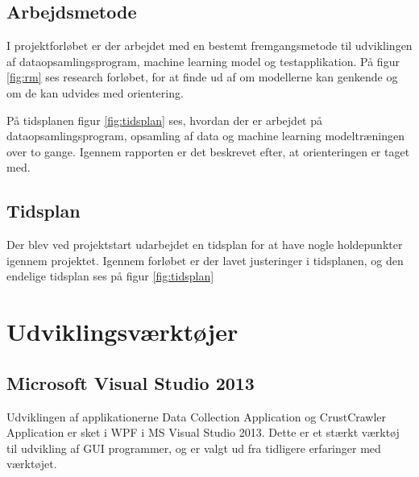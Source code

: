 \subsection{Arbejdsmetode}
I projektforløbet er der arbejdet med en bestemt fremgangsmetode til udviklingen af dataopsamlingsprogram, machine learning model og testapplikation. På figur \ref{fig:rm} ses research forløbet, for at finde ud af om modellerne kan genkende og om de kan udvides med orientering.


På tidsplanen figur \ref{fig:tidsplan} ses, hvordan der er arbejdet på dataopsamlingsprogram, opsamling af data og machine learning modeltræningen over to gange. Igennem rapporten er det beskrevet efter, at orienteringen er taget med.


\subsection{Tidsplan}
\label{sec:tidsplan}
Der blev ved projektstart udarbejdet en tidsplan for at have nogle holdepunkter igennem projektet. Igennem forløbet er der lavet justeringer i tidsplanen, og den endelige tidsplan ses på figur \ref{fig:tidsplan}


\section{Udviklingsværktøjer}
\label{sec:Udviklingsvaerktojer}

\subsection*{Microsoft Visual Studio 2013}
Udviklingen af applikationerne Data Collection Application og CrustCrawler Application er sket i WPF i MS Visual Studio 2013. Dette er et stærkt værktøj til udvikling af GUI programmer, og er valgt ud fra tidligere erfaringer med værktøjet.

